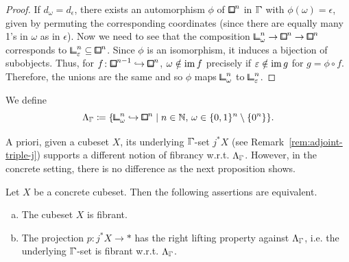 \begin{proof}
If $d_\omega = d_\epsilon$, there exists an automorphism $\phi$ of ${\bblox}^n$ in $\bbGamma$ with $\phi(\omega) = \epsilon$,
given by permuting the corresponding coordinates (since there are equally many 1's in $\omega$ as in $\epsilon$).
Now we need to see that the composition ${\bbcor}^n_\omega\to{\bblox}^n\to{\bblox}^n$ corresponds to ${\bbcor}^n_\epsilon\sub{\bblox}^n$.
Since $\phi$ is an isomorphism, it induces a bijection of subobjects.
Thus, for $f\colon{\bblox}^{n-1}\hookrightarrow{\bblox}^n$, $\omega\notin\operatorname{im} f$ precisely if $\varepsilon\notin\operatorname{im} g$ for $g = \phi\circ f$.
Therefore, the unions are the same and so $\phi$ maps ${\bbcor}^n_\omega$ to ${\bbcor}^n_\epsilon$.
\end{proof}

\begin{definition}\label{def:corner_in_gamma}
We define
\[
    \Lambda_{\bbGamma} \coloneq \{{\bbcor}^n_\omega\hookrightarrow{\bblox}^n \mid n\in\N,\,\omega\in\{0,1\}^n\setminus\{0^n\}\}.
\]
\end{definition}

A priori, given a cubeset $X$, its underlying $\bbGamma$-set $j^\ast X$ (see Remark~\ref{rem:adjoint-triple-j})
supports a different notion of fibrancy w.r.t. $\Lambda_{\bbGamma}$.
However, in the concrete setting, there is no difference as the next proposition shows.

\begin{proposition}\label{prop:nilfib-restricted-nilfib-concrete}
Let $X$ be a concrete cubeset.
Then the following assertions are equivalent.
\begin{enumerate}[(a)]
    \item The cubeset $X$ is fibrant.
    \item The projection $p\colon j^\ast X\to\ast$ has the right lifting property against
        $\Lambda_{\bbGamma}$, i.e. the underlying $\bbGamma$-set is fibrant w.r.t. $\Lambda_{\bbGamma}$.
\end{enumerate}
\end{proposition}

